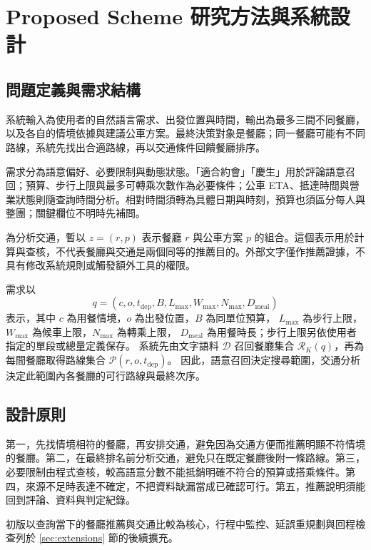 \chapter{Proposed Scheme 研究方法與系統設計}

\section{問題定義與需求結構}
\label{sec:problem_definition}

系統輸入為使用者的自然語言需求、出發位置與時間，輸出為最多三間不同餐廳，以及各自的情境依據與建議公車方案。最終決策對象是餐廳；同一餐廳可能有不同路線，系統先找出合適路線，再以交通條件回饋餐廳排序。

需求分為語意偏好、必要限制與動態狀態。「適合約會」「慶生」用於評論語意召回；預算、步行上限與最多可轉乘次數作為必要條件；公車 ETA、抵達時間與營業狀態則隨查詢時間分析。相對時間須轉為具體日期與時刻，預算也須區分每人與整團；關鍵欄位不明時先補問。

為分析交通，暫以 \(z=(r,p)\) 表示餐廳 \(r\) 與公車方案 \(p\) 的組合。這個表示用於計算與查核，不代表餐廳與交通是兩個同等的推薦目的。外部文字僅作推薦證據，不具有修改系統規則或觸發額外工具的權限。


需求以
\[
q=(c,o,t_{\mathrm{dep}},B,L_{\max},W_{\max},N_{\max},D_{\mathrm{meal}})
\]
表示，其中 \(c\) 為用餐情境，\(o\) 為出發位置，\(B\) 為同單位預算，
\(L_{\max}\) 為步行上限，\(W_{\max}\) 為候車上限，\(N_{\max}\) 為轉乘上限，
\(D_{\mathrm{meal}}\) 為用餐時長；步行上限另依使用者指定的單段或總量定義保存。
系統先由文字語料 \(\mathcal{D}\) 召回餐廳集合
\(\mathcal{R}_{K}(q)\)，再為每間餐廳取得路線集合
\(\mathcal{P}(r,o,t_{\mathrm{dep}})\)。
因此，語意召回決定搜尋範圍，交通分析決定此範圍內各餐廳的可行路線與最終次序。



\section{設計原則}

第一，先找情境相符的餐廳，再安排交通，避免因為交通方便而推薦明顯不符情境的餐廳。第二，在最終排名前分析交通，避免只在既定餐廳後附一條路線。第三，必要限制由程式查核，較高語意分數不能抵銷明確不符合的預算或搭乘條件。第四，來源不足時表達不確定，不把資料缺漏當成已確認可行。第五，推薦說明須能回到評論、資料與判定紀錄。

初版以查詢當下的餐廳推薦與交通比較為核心，行程中監控、延誤重規劃與回程檢查列於 \ref{sec:extensions} 節的後續擴充。

